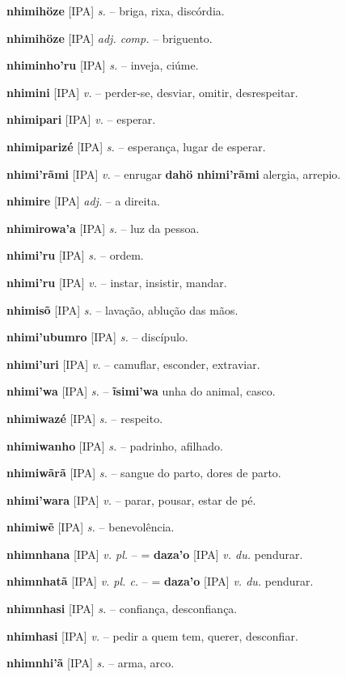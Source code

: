 \textbf{nhimihöze} [IPA] \textit{s.} -- briga, rixa, discórdia.

\textbf{nhimihöze} [IPA] \textit{adj. comp.} -- briguento.

\textbf{nhiminho'ru} [IPA] \textit{s.} -- inveja, ciúme.

\textbf{nhimini} [IPA] \textit{v.} -- perder-se, desviar, omitir, desrespeitar.

\textbf{nhimipari} [IPA] \textit{v.} -- esperar.

\textbf{nhimiparizé} [IPA] \textit{s.} -- esperança, lugar de esperar.

\textbf{nhimi'rãmi} [IPA] \textit{v.} -- enrugar  \textbf{dahö nhimi'rãmi} alergia, arrepio.

\textbf{nhimire} [IPA] \textit{adj.} -- a direita.

\textbf{nhimirowa'a} [IPA] \textit{s.} -- luz da pessoa.

\textbf{nhimi'ru} [IPA] \textit{s.} -- ordem.

\textbf{nhimi'ru} [IPA] \textit{v.} -- instar, insistir, mandar.

\textbf{nhimisõ} [IPA] \textit{s.} -- lavação, ablução das mãos.

\textbf{nhimi'ubumro} [IPA] \textit{s.} -- discípulo.

\textbf{nhimi'uri} [IPA] \textit{v.} -- camuflar, esconder, extraviar.

\textbf{nhimi'wa} [IPA] \textit{s.} -- \textbf{ĩsimi'wa} unha do animal, casco.

\textbf{nhimiwazé} [IPA] \textit{s.} -- respeito.

\textbf{nhimiwanho} [IPA] \textit{s.} -- padrinho, afilhado.

\textbf{nhimiwãrã} [IPA] \textit{s.} -- sangue do parto, dores de parto.

\textbf{nhimi'wara} [IPA] \textit{v.} -- parar, pousar, estar de pé.

\textbf{nhimiwẽ} [IPA] \textit{s.} -- benevolência.

\textbf{nhimnhana} [IPA] \textit{v. pl.} -- = \textbf{daza'o} [IPA] \textit{v. du.} pendurar.

\textbf{nhimnhatã} [IPA] \textit{v. pl. c.} -- = \textbf{daza'o} [IPA] \textit{v. du.} pendurar.

\textbf{nhimnhasi} [IPA] \textit{s.} -- confiança, desconfiança.

\textbf{nhimhasi} [IPA] \textit{v.} -- pedir a quem tem, querer, desconfiar.

\textbf{nhimnhi'ã} [IPA] \textit{s.} -- arma, arco.

